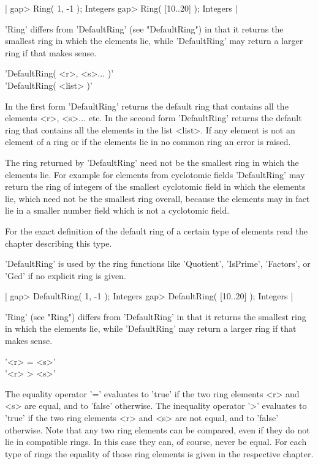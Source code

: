 |    gap> Ring( 1, -1 );
    Integers
    gap> Ring( [10..20] );
    Integers |

'Ring' differs from 'DefaultRing' (see "DefaultRing") in  that it returns
the  smallest  ring in which  the elements  lie, while 'DefaultRing'  may
return a larger ring if that makes sense.


'DefaultRing( <r>, <s>... )' \\
'DefaultRing( <list> )'

In the  first form 'DefaultRing' returns the  default  ring that contains
all  the elements  <r>,  <s>...  etc.   In the  second form 'DefaultRing'
returns  the default  ring that contains all  the elements  in  the  list
<list>.  If any element  is not an element of a ring or  if  the elements
lie in no common ring an error is raised.

The ring returned by 'DefaultRing' need not be the smallest ring in which
the  elements  lie.  For   example   for elements from  cyclotomic fields
'DefaultRing' may return the ring of integers of  the smallest cyclotomic
field  in which the elements  lie,  which need not  be  the smallest ring
overall, because the elements may in  fact lie in  a smaller number field
which is not a cyclotomic field.

For  the  exact  definition of  the  default  ring  of a certain type  of
elements read the chapter describing this type.

'DefaultRing' is used by  the ring functions like  'Quotient', 'IsPrime',
'Factors', or 'Gcd' if no explicit ring is given.

|    gap> DefaultRing( 1, -1 );
    Integers
    gap> DefaultRing( [10..20] );
    Integers |

'Ring' (see "Ring") differs  from 'DefaultRing' in   that it  returns the
smallest ring in which the elements lie, while 'DefaultRing' may return a
larger ring if that makes sense.


'<r> =   <s>' \\
'<r> \<> <s>'

The equality operator '=' evaluates to 'true' if  the  two  ring elements
<r> and <s> are equal, and to 'false' otherwise.  The inequality operator
'\<>' evaluates to 'true' if the two ring  elements <r> and <s>  are  not
equal, and to 'false' otherwise.   Note that any two ring elements can be
compared, even if they do not lie in compatible rings.  In this case they
can, of course, never  be  equal.  For each type of rings the equality of
those ring elements is given in the respective chapter.

